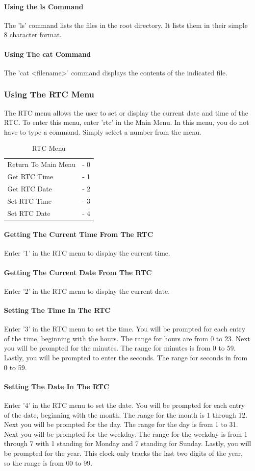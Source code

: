 \documentclass[acmlarge,screen]{acmart}
\begin{document}
\paragraph{Using the ls Command}
The 'ls' command lists the files in the root directory. It lists them in their simple 8 character format.
\paragraph{Using The cat Command}
The 'cat <filename>' command displays the contents of the indicated file.
\subsubsection{Using The RTC Menu}
The RTC menu allows the user to set or display the current date and time of the RTC. To enter this menu, enter 'rtc' in the Main Menu. In this menu, you do not have to type a command. Simply select a number from the menu.
\begin{table}[H]
\begin{tabular}{l l} 
Return To Main Menu & - 0\\
Get RTC Time & - 1\\
Get RTC Date & - 2\\
Set RTC Time & - 3\\
Set RTC Date & - 4\\
\end{tabular} 
\caption{RTC Menu}
\end{table}
\paragraph{Getting The Current Time From The RTC}
Enter '1' in the RTC menu to display the current time.
\paragraph{Getting The Current Date From The RTC}
Enter '2' in the RTC menu to display the current date.
\paragraph{Setting The Time In The RTC}
Enter '3' in the RTC menu to set the time. You will be prompted for each entry of the time, beginning with the hours. The range for hours are from 0 to 23. Next you will be prompted for the minutes. The range for minutes is from 0 to 59. Lastly, you will be prompted to enter the seconds.
The range for seconds in from 0 to 59.
\paragraph{Setting The Date In The RTC}
Enter '4' in the RTC menu to set the date. You will be prompted for each entry of the date, beginning with the month. The range for the month is 1 through 12. Next you will be prompted for the day. The range for the day is from 1 to 31. Next you will be prompted for the weekday. The range for the weekday is from 1 through 7 with 1 standing for Monday and 7 standing for Sunday. Lastly, you will be prompted for the year. This clock only tracks the last two digits of the year, so the range is from 00 to 99.
\end{document}
